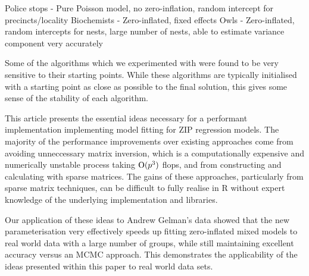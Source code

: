 			Police stops - Pure Poisson model, no zero-inflation, random intercept for precincts/locality
			Biochemists - Zero-inflated, fixed effects
			Owls - Zero-inflated, random intercepts for nests, large number of nests, able to estimate variance 
			component very accurately
				
			Some of the algorithms which we experimented with were found to be very sensitive to their starting points.
			While these algorithms are typically initialised with a starting point as close as possible to the final
			solution, this gives some sense of the stability of each algorithm.
					
			This article presents the essential ideas necessary for a performant implementation implementing model fitting
			for ZIP regression models.%
			The majority of the performance
			improvements over existing approaches come from avoiding unneccessary matrix inversion, which is a
			computationally expensive and numerically unstable process taking $\text{O}(p^3)$ flops, and from constructing and 
			calculating	with sparse matrices. The gains of these approaches, particularly from sparse matrix techniques, 
			can be difficult to fully realise in R without expert knowledge of the underlying implementation and libraries.
					
			Our application of these ideas to Andrew Gelman's data showed that the new parameterisation very effectively
			speeds up fitting zero-inflated mixed models to real world data with a large number of groups, while still
			maintaining excellent accuracy versus an MCMC approach. This demonstrates the applicability of the ideas
			presented within this paper to real world data sets.
					
